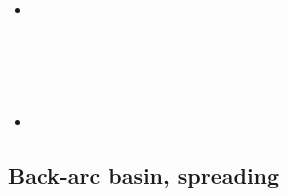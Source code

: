 \begin{scriptsize}
\begin{itemize}
\item[\twothousandtwentyone] 
\textcite{hafw21} \\
\textcite{mabh21} \\
\textcite{mota21} \\ 
\textcite{frbi21} \\ 
\textcite{siht21} \\ 
\item[\twothousandtwentytwo] 
\textcite{kewa22} \\ 
\end{itemize}
\end{scriptsize}

\subsection{Back-arc basin, spreading}

